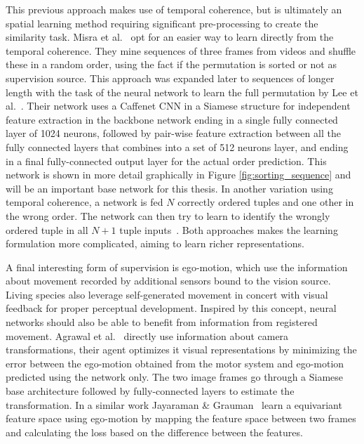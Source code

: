 This previous approach makes use of temporal coherence, but is ultimately an spatial learning method requiring significant pre-processing to create the similarity task. Misra et al.~\cite{misra2016} opt for an easier way to learn directly from the temporal coherence. They mine sequences of three frames from videos and shuffle these in a random order, using the fact if the permutation is sorted or not as supervision source. This approach was expanded later to sequences of longer length with the task of the neural network to learn the full permutation by Lee et al.~\cite{lee2017}. Their network uses a Caffenet\cite{jia2014} CNN in a Siamese structure for independent feature extraction in the backbone network ending in a single fully connected layer of 1024 neurons, followed by pair-wise feature extraction between all the fully connected layers that combines into a set of 512 neurons layer, and ending in a final fully-connected output layer for the actual order prediction. This network is shown in more detail graphically in Figure \ref{fig:sorting_sequence} and will be an important base network for this thesis. In another variation using temporal coherence, a network is fed $N$ correctly ordered tuples and one other in the wrong order. The network can then try to learn to identify the wrongly ordered tuple in all $N+1$ tuple inputs~\cite{fernando2017}. Both approaches makes the learning formulation more complicated, aiming to learn richer representations. 

A final interesting form of supervision is ego-motion, which use the information about movement recorded by additional sensors bound to the vision source. Living species also leverage self-generated movement in concert with visual feedback for proper perceptual development. Inspired by this concept, neural networks should also be able to benefit from information from registered movement. Agrawal et al.~\cite{agrawal2015} directly use information about camera transformations, their agent optimizes it visual representations by minimizing the error between the ego-motion obtained from the motor system and ego-motion predicted using the network only. The two image frames go through a Siamese base architecture followed by fully-connected layers to estimate the transformation. In a similar work Jayaraman \& Grauman~\cite{jayaraman2015} learn a equivariant feature space using ego-motion by mapping the feature space between two frames and calculating the loss based on the difference between the features.


